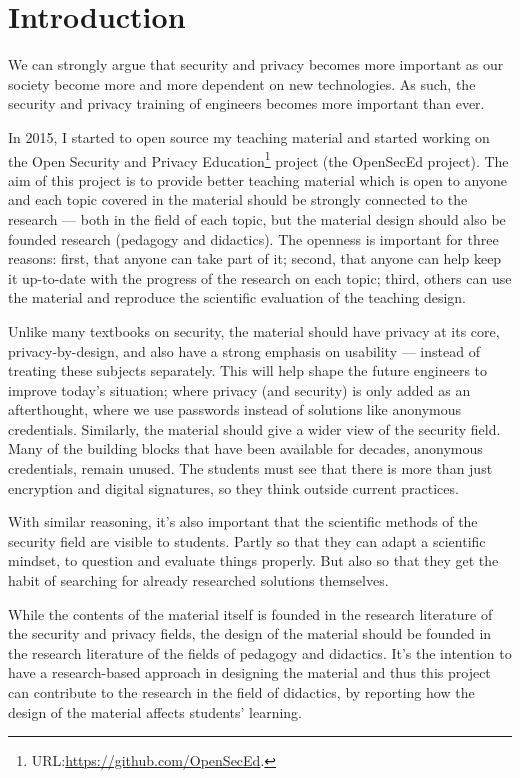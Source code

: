 \mode*
\section{Introduction}

We can strongly argue that security and privacy becomes more important as our 
society become more and more dependent on new technologies.
As such, the security and privacy training of engineers becomes more important 
than ever.

In 2015, I started to open source my teaching material and started working on 
the Open Security and Privacy Education\footnote{%
  URL:\@ \url{https://github.com/OpenSecEd}.
} project (the OpenSecEd project).
The aim of this project is to provide better teaching material which is open
to anyone and each topic covered in the material should be strongly connected 
to the research --- both in the field of each topic, but the material design 
should also be founded research (pedagogy and didactics).
The openness is important for three reasons: first, that anyone can take part 
of it; second, that anyone can help keep it up-to-date with the progress of the 
research on each topic; third, others can use the material and reproduce the 
scientific evaluation of the teaching design.

Unlike many textbooks on security, the material should have privacy at
its core, \eg privacy-by-design, and also have a strong emphasis on usability 
--- instead of treating these subjects separately.
This will help shape the future engineers to improve today's situation; where 
privacy (and security) is only added as an afterthought, where we use passwords 
instead of solutions like anonymous credentials.
Similarly, the material should give a wider view of the security field.
Many of the building blocks that have been available for decades, \eg anonymous
credentials, remain unused.
The students must see that there is more than just encryption and digital 
signatures, so they think outside current practices.

With similar reasoning, it's also important that the scientific methods of the 
security field are visible to students.
Partly so that they can adapt a scientific mindset, to question and evaluate 
things properly.
But also so that they get the habit of searching for already researched 
solutions themselves.

While the contents of the material itself is founded in the research literature 
of the security and privacy fields, the design of the material should be 
founded in the research literature of the fields of pedagogy and didactics.
It's the intention to have a research-based approach in designing the material 
and thus this project can contribute to the research in the field of didactics, 
\eg by reporting how the design of the material affects students' learning.


